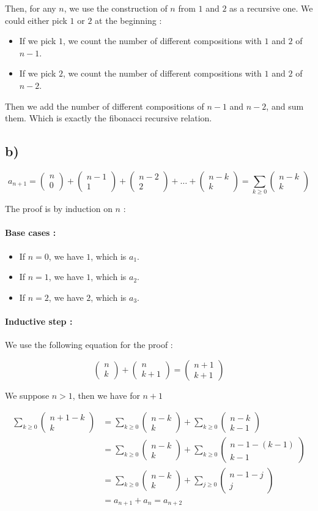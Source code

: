 \documentclass[a4paper,11pt]{report}
\newcommand*{\bin}[2]{\begin{pmatrix}#1 \\ #2\end{pmatrix}}
\begin{document}
Then, for any $n$, we use the construction of $n$ from $1$ and $2$ as a
recursive one. We could either pick $1$ or $2$ at the beginning :
\begin{itemize}
\item If we pick $1$, we count the number of different compositions with $1$ and
  $2$ of $n-1$.
\item If we pick $2$, we count the number of different compositions with $1$ and
  $2$ of $n-2$.
\end{itemize}

Then we add the number of different compositions of $n-1$ and $n-2$, and sum
them. Which is exactly the fibonacci recursive relation.

\subsection*{b)}

\[
  a_{n+1} = \bin{n}{0} + \bin{n-1}{1} + \bin{n-2}{2} + \dots + \bin{n-k}{k} =
  \sum_{k \geq 0} \bin{n-k}{k}
\]

The proof is by induction on $n$ :

\paragraph{Base cases : }
\begin{itemize}
\item If $n = 0$, we have $1$, which is $a_1$.
\item If $n = 1$, we have $1$, which is $a_2$.
\item If $n = 2$, we have $2$, which is $a_3$.
\end{itemize}

\paragraph{Inductive step : }

We use the following equation for the proof :

\[
  \bin{n}{k} + \bin{n}{k+1} = \bin{n+1}{k+1}
\]

We suppose $n > 1$, then we have for $n+1$

\begin{align*}
  \sum_{k \geq 0} \bin{n + 1 - k}{k}
  &= \sum_{k \geq 0} \bin{n-k}{k} + \sum_{k \geq 0} \bin{n-k}{k-1} \\
  &= \sum_{k \geq 0} \bin{n-k}{k} + \sum_{k \geq 0} \bin{n - 1 - (k - 1)}{k-1} \\
  &= \sum_{k \geq 0} \bin{n-k}{k} + \sum_{j \geq 0} \bin{n - 1 - j}{j} \\
  &= a_{n+1} + a_{n} = a_{n + 2}
\end{align*}
\end{document}
